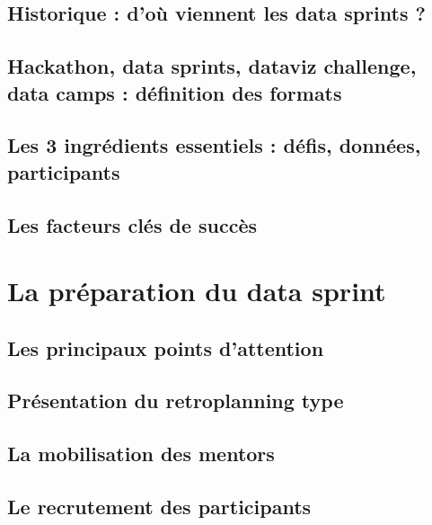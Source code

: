 \documentclass[]{book}
\begin{document}
\section{Historique : d'où viennent les data sprints
?}\label{historique-dou-viennent-les-data-sprints}

\section{Hackathon, data sprints, dataviz challenge, data camps :
définition des
formats}\label{hackathon-data-sprints-dataviz-challenge-data-camps-definition-des-formats}

\section{Les 3 ingrédients essentiels : défis, données,
participants}\label{les-3-ingredients-essentiels-defis-donnees-participants}

\section{Les facteurs clés de succès}\label{les-facteurs-cles-de-succes}

\chapter{La préparation du data sprint}\label{preparation}

\section{Les principaux points
d'attention}\label{les-principaux-points-dattention}

\section{Présentation du retroplanning
type}\label{presentation-du-retroplanning-type}

\section{La mobilisation des mentors}\label{la-mobilisation-des-mentors}

\section{Le recrutement des
participants}\label{le-recrutement-des-participants}
\end{document}
